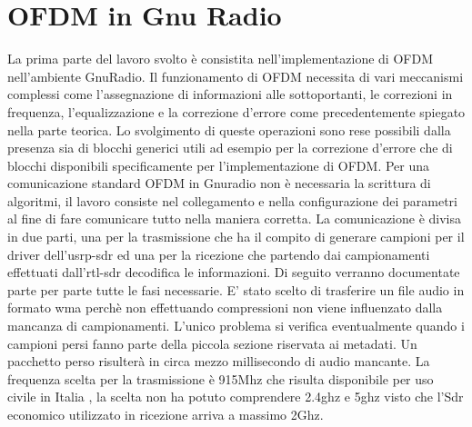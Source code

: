 \chapter{OFDM in Gnu Radio}
\label{cha:789}
La prima parte del lavoro svolto è consistita nell'implementazione di OFDM nell'ambiente GnuRadio. Il funzionamento di OFDM necessita di vari meccanismi complessi come l'assegnazione di informazioni alle sottoportanti, le correzioni in frequenza, l'equalizzazione e la correzione d'errore come precedentemente spiegato nella parte teorica. Lo svolgimento di queste operazioni sono rese possibili dalla presenza sia di blocchi generici utili ad esempio per la correzione d'errore che di blocchi disponibili specificamente per l'implementazione di OFDM. Per una comunicazione standard OFDM in Gnuradio non è necessaria la scrittura di algoritmi, il lavoro consiste nel collegamento e nella configurazione dei parametri al fine di fare comunicare tutto nella maniera corretta.
La comunicazione è divisa in due parti, una per la trasmissione che ha il compito di generare campioni per il driver dell'usrp-sdr ed una per la ricezione che partendo dai campionamenti effettuati dall'rtl-sdr decodifica le informazioni. Di seguito verranno documentate parte per parte tutte le fasi necessarie.
E' stato scelto di trasferire un file audio in formato wma perchè non effettuando compressioni non viene influenzato dalla mancanza di campionamenti. L'unico problema si verifica eventualmente quando i campioni persi fanno parte della piccola sezione riservata ai metadati. Un pacchetto perso risulterà in circa mezzo millisecondo di audio mancante. La frequenza scelta per la trasmissione è 915Mhz che risulta disponibile per uso civile in Italia \cite{frequenze}, la scelta non ha potuto comprendere 2.4ghz e 5ghz visto che l'Sdr economico utilizzato in ricezione arriva a massimo 2Ghz.
